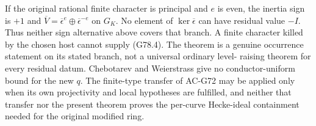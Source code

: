 \begin{remark}
If the original rational finite character is principal
and \(e\) is even, the inertia sign is \(+1\) and
\(\overline V=\overline\epsilon^e\oplus
\overline\epsilon^{-e}\) on \(G_K\).
No element of \(\ker\overline\epsilon\) can have
residual value \(-I\).
Thus neither sign alternative above covers that branch.
A finite character killed by the chosen host cannot
supply (G78.4).
The theorem is a genuine occurrence statement on
its stated branch, not a universal ordinary level-
raising theorem for every residual datum.
Chebotarev and Weierstrass give no conductor-uniform
bound for the new \(q\).
The finite-type transfer of AC-G72 may be applied
only when its own projectivity and local hypotheses
are fulfilled, and neither that transfer nor the
present theorem proves the per-curve Hecke-ideal
containment needed for the original modified ring.
\end{remark}
